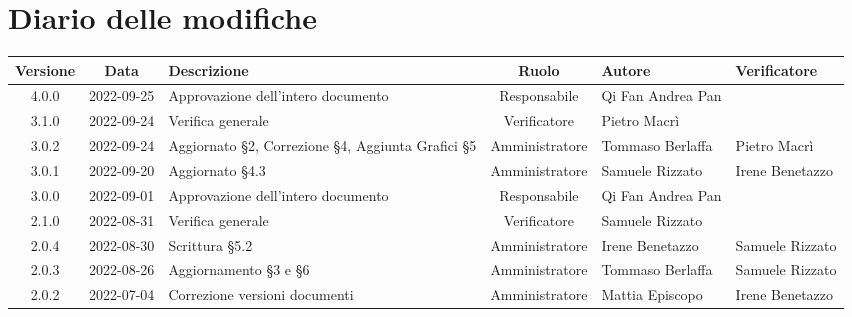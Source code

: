 \section*{Diario delle modifiche}
	\begin{center}
	\renewcommand{\arraystretch}{1.8} %
	\begin{longtable}{ |c|c|p{8em}|c|m{5em}|m{6em}| }
		\hline
		\textbf{Versione} & \textbf{Data} & \textbf{Descrizione} &  \textbf{Ruolo} &  \textbf{Autore} & \textbf{Verificatore} \\
    \hline
		4.0.0 & 2022-09-25 & Approvazione dell'intero documento & Responsabile & Qi Fan \newline Andrea Pan & \\
		\hline
		3.1.0 & 2022-09-24 & Verifica generale & Verificatore & Pietro \newline Macrì & \\
		\hline
		3.0.2 & 2022-09-24 & Aggiornato §2, \newline Correzione §4, \newline Aggiunta Grafici §5 & Amministratore & Tommaso \newline Berlaffa & Pietro \newline Macrì \\
    	\hline
		3.0.1 & 2022-09-20 & Aggiornato §4.3 & Amministratore & Samuele \newline Rizzato & Irene \newline Benetazzo \\
    	\hline
		3.0.0 & 2022-09-01 & Approvazione dell'intero documento & Responsabile & Qi Fan \newline Andrea Pan & \\
		\hline
		2.1.0 & 2022-08-31 & Verifica generale & Verificatore & Samuele \newline Rizzato & \\
		\hline
		2.0.4 & 2022-08-30 & Scrittura §5.2 & Amministratore & Irene \newline Benetazzo & Samuele \newline Rizzato\\
		\hline
		2.0.3 & 2022-08-26 & Aggiornamento §3 e §6 & Amministratore & Tommaso Berlaffa & Samuele \newline Rizzato\\
		\hline
		2.0.2 & 2022-07-04 & Correzione versioni documenti & Amministratore & Mattia \newline Episcopo & Irene \newline Benetazzo\\

\end{longtable}
\end{center}
